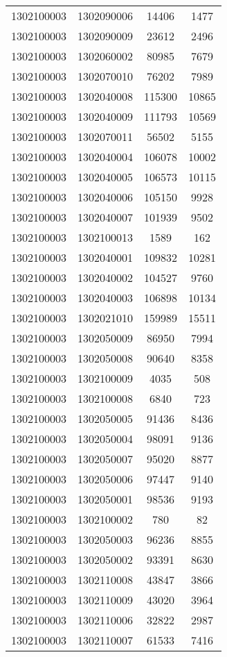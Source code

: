\begin{longtable}[h]{llcc}
		1302100003 & 1302090006 & 14406 & 1477\\
		1302100003 & 1302090009 & 23612 & 2496\\
		1302100003 & 1302060002 & 80985 & 7679\\
		1302100003 & 1302070010 & 76202 & 7989\\
		1302100003 & 1302040008 & 115300 & 10865\\
		1302100003 & 1302040009 & 111793 & 10569\\
		1302100003 & 1302070011 & 56502 & 5155\\
		1302100003 & 1302040004 & 106078 & 10002\\
		1302100003 & 1302040005 & 106573 & 10115\\
		1302100003 & 1302040006 & 105150 & 9928\\
		1302100003 & 1302040007 & 101939 & 9502\\
		1302100003 & 1302100013 & 1589 & 162\\
		1302100003 & 1302040001 & 109832 & 10281\\
		1302100003 & 1302040002 & 104527 & 9760\\
		1302100003 & 1302040003 & 106898 & 10134\\
		1302100003 & 1302021010 & 159989 & 15511\\
		1302100003 & 1302050009 & 86950 & 7994\\
		1302100003 & 1302050008 & 90640 & 8358\\
		1302100003 & 1302100009 & 4035 & 508\\
		1302100003 & 1302100008 & 6840 & 723\\
		1302100003 & 1302050005 & 91436 & 8436\\
		1302100003 & 1302050004 & 98091 & 9136\\
		1302100003 & 1302050007 & 95020 & 8877\\
		1302100003 & 1302050006 & 97447 & 9140\\
		1302100003 & 1302050001 & 98536 & 9193\\
		1302100003 & 1302100002 & 780 & 82\\
		1302100003 & 1302050003 & 96236 & 8855\\
		1302100003 & 1302050002 & 93391 & 8630\\
		1302100003 & 1302110008 & 43847 & 3866\\
		1302100003 & 1302110009 & 43020 & 3964\\
		1302100003 & 1302110006 & 32822 & 2987\\
		1302100003 & 1302110007 & 61533 & 7416\\

\end{longtable}
